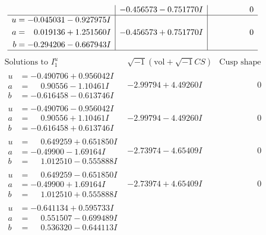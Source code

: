 \documentclass[1p]{elsarticle_modified}
\theoremstyle{definition}
\newcommand{\I}{\sqrt{-1}}
\begin{document}
$$\begin{array}{c|c|c}
 & -0.456573 - 0.751770 I & \phantom{-0.000000 } 0 \\ \hline\begin{aligned}
u &= -0.045031 - 0.927975 I \\
a &= \phantom{-}0.019136 + 1.251560 I \\
b &= -0.294206 - 0.667943 I\end{aligned}
 & -0.456573 + 0.751770 I & \phantom{-0.000000 } 0\\
 \hline 
 \end{array}$$\newpage$$\begin{array}{c|c|c}  
\text{Solutions to }I^u_{1}& \I (\text{vol} + \sqrt{-1}CS) & \text{Cusp shape}\\
 \hline 
\begin{aligned}
u &= -0.490706 + 0.956042 I \\
a &= \phantom{-}0.90556 - 1.10461 I \\
b &= -0.616458 - 0.613746 I\end{aligned}
 & -2.99794 + 4.49260 I & \phantom{-0.000000 } 0 \\ \hline\begin{aligned}
u &= -0.490706 - 0.956042 I \\
a &= \phantom{-}0.90556 + 1.10461 I \\
b &= -0.616458 + 0.613746 I\end{aligned}
 & -2.99794 - 4.49260 I & \phantom{-0.000000 } 0 \\ \hline\begin{aligned}
u &= \phantom{-}0.649259 + 0.651850 I \\
a &= -0.49900 - 1.69164 I \\
b &= \phantom{-}1.012510 - 0.555888 I\end{aligned}
 & -2.73974 - 4.65409 I & \phantom{-0.000000 } 0 \\ \hline\begin{aligned}
u &= \phantom{-}0.649259 - 0.651850 I \\
a &= -0.49900 + 1.69164 I \\
b &= \phantom{-}1.012510 + 0.555888 I\end{aligned}
 & -2.73974 + 4.65409 I & \phantom{-0.000000 } 0 \\ \hline\begin{aligned}
u &= -0.641134 + 0.595733 I \\
a &= \phantom{-}0.551507 - 0.699489 I \\
b &= \phantom{-}0.536320 - 0.644113 I\end{aligned}

\end{array}$$
\end{document}
